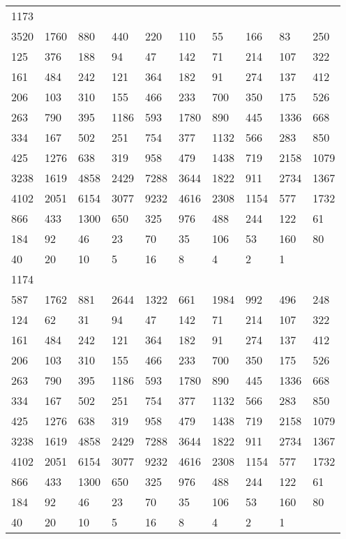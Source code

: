\begin{longtable}{*{10}{l}}
1173&&&&&&&&&\\
3520& 1760& 880& 440& 220& 110& 55& 166& 83& 250\\
125& 376& 188& 94& 47& 142& 71& 214& 107& 322\\
161& 484& 242& 121& 364& 182& 91& 274& 137& 412\\
206& 103& 310& 155& 466& 233& 700& 350& 175& 526\\
263& 790& 395& 1186& 593& 1780& 890& 445& 1336& 668\\
334& 167& 502& 251& 754& 377& 1132& 566& 283& 850\\
425& 1276& 638& 319& 958& 479& 1438& 719& 2158& 1079\\
3238& 1619& 4858& 2429& 7288& 3644& 1822& 911& 2734& 1367\\
4102& 2051& 6154& 3077& 9232& 4616& 2308& 1154& 577& 1732\\
866& 433& 1300& 650& 325& 976& 488& 244& 122& 61\\
184& 92& 46& 23& 70& 35& 106& 53& 160& 80\\
40& 20& 10& 5& 16& 8& 4& 2& 1& \\

1174&&&&&&&&&\\
587& 1762& 881& 2644& 1322& 661& 1984& 992& 496& 248\\
124& 62& 31& 94& 47& 142& 71& 214& 107& 322\\
161& 484& 242& 121& 364& 182& 91& 274& 137& 412\\
206& 103& 310& 155& 466& 233& 700& 350& 175& 526\\
263& 790& 395& 1186& 593& 1780& 890& 445& 1336& 668\\
334& 167& 502& 251& 754& 377& 1132& 566& 283& 850\\
425& 1276& 638& 319& 958& 479& 1438& 719& 2158& 1079\\
3238& 1619& 4858& 2429& 7288& 3644& 1822& 911& 2734& 1367\\
4102& 2051& 6154& 3077& 9232& 4616& 2308& 1154& 577& 1732\\
866& 433& 1300& 650& 325& 976& 488& 244& 122& 61\\
184& 92& 46& 23& 70& 35& 106& 53& 160& 80\\
40& 20& 10& 5& 16& 8& 4& 2& 1& \\


\end{longtable}
